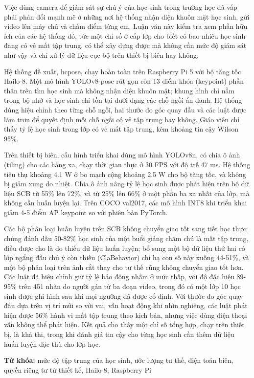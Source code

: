 Việc dùng camera để giám sát sự chú ý của học sinh trong trường học đã vấp phải phản đối mạnh mẽ ở những nơi hệ thống nhận diện khuôn mặt học sinh, gửi video lên máy chủ và chấm điểm từng em. Luận văn này kiểm tra xem phần hữu ích của các hệ thống đó, tức một chỉ số ở cấp lớp cho biết có bao nhiêu học sinh đang có vẻ mất tập trung, có thể xây dựng được mà không cần mức độ giám sát như vậy và chỉ xử lý dữ liệu cục bộ trên thiết bị biên hay không.

Hệ thống đề xuất, hcpose, chạy hoàn toàn trên Raspberry Pi 5 với bộ tăng tốc Hailo-8. Một mô hình YOLOv8-pose rút gọn còn 13 điểm khóa (keypoint) phần thân trên tìm học sinh mà không nhận diện khuôn mặt; khung hình chỉ nằm trong bộ nhớ và học sinh chỉ tồn tại dưới dạng các chỗ ngồi ẩn danh. Hệ thống dùng hiệu chỉnh theo từng chỗ ngồi, hai thước đo góc quay đầu và các luật được làm trơn để quyết định mỗi chỗ ngồi có vẻ tập trung hay không. Giáo viên chỉ thấy tỷ lệ học sinh trong lớp có vẻ mất tập trung, kèm khoảng tin cậy Wilson 95\%.

Trên thiết bị biên, cấu hình triển khai dùng mô hình YOLOv8n, có chia ô ảnh (tiling) cho các hàng xa, chạy thời gian thực ở 30 FPS với độ trễ 47 ms. Hệ thống tiêu thụ khoảng 4.1 W ở bo mạch cộng khoảng 2.5 W cho bộ tăng tốc, và không bị giảm xung do nhiệt. Chia ô ảnh nâng tỷ lệ học sinh được phát hiện trên bộ dữ liệu SCB từ 55\% lên 72\%, và từ 25\% lên 66\% ở một phần ba xa nhất của lớp, mà không cần huấn luyện lại. Trên COCO val2017, các mô hình INT8 khi triển khai giảm 4-5 điểm AP keypoint so với phiên bản PyTorch.

Các bộ phân loại huấn luyện trên SCB không chuyển giao tốt sang tiết học thực: chúng đánh dấu 50-82\% học sinh của một buổi giảng chăm chú là mất tập trung, điều được cho là do thiếu dữ liệu huấn luyện; bổ sung một bộ dữ liệu thứ hai có lớp ngẩng đầu chú ý còn thiếu (ClaBehavior) chỉ hạ con số này xuống 44-51\%, và một bộ phân loại trên ảnh cắt thay cho tư thế cũng không chuyển giao tốt hơn. Các luật đã hiệu chỉnh giữ tỷ lệ báo động nhầm ở mức thấp, với độ đặc hiệu 89-95\% trên 451 nhãn do người gán từ ba đoạn video, trong đó có một lớp 10 học sinh được ghi hình sau khi mọi ngưỡng đã được cố định. Với thước đo góc quay đầu dựa trên vị trí mũi so với vai, vẫn hoạt động khi nhìn nghiêng, các luật phát hiện được 56\% hành vi mất tập trung theo kịch bản, nhưng việc dùng điện thoại vẫn không thể phát hiện. Kết quả cho thấy một chỉ số tổng hợp, chạy trên thiết bị, là khả thi, trong khi đánh giá tin cậy cho từng học sinh cần thêm dữ liệu huấn luyện đặc thù cho lớp học.

\textbf{Từ khóa:} mức độ tập trung của học sinh, ước lượng tư thế, điện toán biên, quyền riêng tư từ thiết kế, Hailo-8, Raspberry Pi
